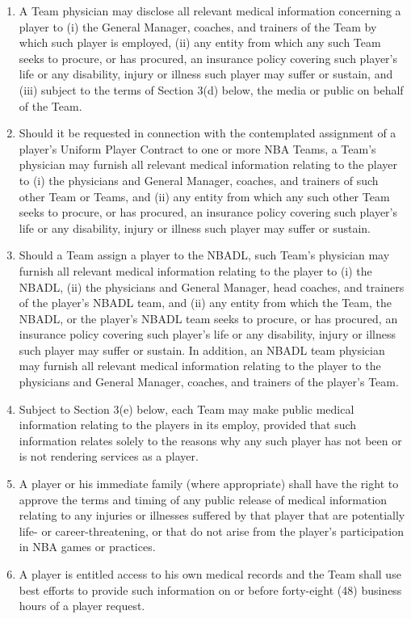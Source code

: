 \documentclass[
]{book}
\providecommand{\tightlist}{%
  \setlength{\itemsep}{0pt}\setlength{\parskip}{0pt}}
\begin{document}
\begin{enumerate}
\def\labelenumi{(\alph{enumi})}
\tightlist
\item
  A Team physician may disclose all relevant medical information concerning a player to (i) the General Manager, coaches, and trainers of the Team by which such player is employed, (ii) any entity from which any such Team seeks to procure, or has procured, an insurance policy covering such player's life or any disability, injury or illness such player may suffer or sustain, and (iii) subject to the terms of Section 3(d) below, the media or public on behalf of the Team.
\item
  Should it be requested in connection with the contemplated assignment of a player's Uniform Player Contract to one or more NBA Teams, a Team's physician may furnish all relevant medical information relating to the player to (i) the physicians and General Manager, coaches, and trainers of such other Team or Teams, and (ii) any entity from which any such other Team seeks to procure, or has procured, an insurance policy covering such player's life or any disability, injury or illness such player may suffer or sustain.
\item
  Should a Team assign a player to the NBADL, such Team's physician may furnish all relevant medical information relating to the player to (i) the NBADL, (ii) the physicians and General Manager, head coaches, and trainers of the player's NBADL team, and (ii) any entity from which the Team, the NBADL, or the player's NBADL team seeks to procure, or has procured, an insurance policy covering such player's life or any disability, injury or illness such player may suffer or sustain. In addition, an NBADL team physician may furnish all relevant medical information relating to the player to the physicians and General Manager, coaches, and trainers of the player's Team.
\item
  Subject to Section 3(e) below, each Team may make public medical information relating to the players in its employ, provided that such information relates solely to the reasons why any such player has not been or is not rendering services as a player.
\item
  A player or his immediate family (where appropriate) shall have the right to approve the terms and timing of any public release of medical information relating to any injuries or illnesses suffered by that player that are potentially life- or career-threatening, or that do not arise from the player's participation in NBA games or practices.
\item
  A player is entitled access to his own medical records and the Team shall use best efforts to provide such information on or before forty-eight (48) business hours of a player request.
\end{enumerate}
\end{document}
